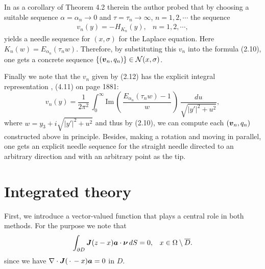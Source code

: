  In \cite{IProbeCarleman} as a corollary
 of Theorem 4.2 therein
 the author probed that
 by choosing a suitable sequence $\alpha=\alpha_n\rightarrow 0$ and $\tau=\tau_n\rightarrow\infty$, $n=1,2,\cdots$
 the sequence
 $$\begin{array}{ll}
 \displaystyle
 v_n(y)=-H_{K_n}(y), & 
 \displaystyle
 n=1,2,\cdots,
 \end{array}
 \tag {2.12}
 $$
 yields a needle sequence for $(x,\sigma)$ for the Laplace equation.  Here $K_n(w)=E_{\alpha_n}(\tau_nw)$.
 Therefore, by substituting this $v_n$ into the formula (2.10), one gets a concrete sequence 
 $\{(\mbox{\boldmath $v$}_n,q_n)\}\in{\cal N}(x,\sigma)$.
 
 
 
  
  
Finally we note that the $v_n$ given by (2.12) has the explicit integral representation \cite{IProbeCarleman}, (4.11) on page 1881:
$$\displaystyle
v_n(y)
=\frac{1}{2\pi^2}\,\int_0^{\infty}
\text{Im}\,\left(\,\frac{E_{\alpha_n}(\tau_n w)-1}{w}\,\right)\,\frac{du}{\sqrt{\vert y'\vert^2+u^2}},
$$
where $w=y_3+i\sqrt{\vert y'\vert^2+u^2}$ and thus by (2.10), we can compute 
each $(\mbox{\boldmath $v$}_n, q_n)$ constructed above  in principle.  
Besides, making a rotation and moving in parallel,
one gets an explicit needle sequence for the straight needle directed to an arbitrary direction and with
an arbitrary point as the tip.

 
  
  
  
  
  
  
  



\section{Integrated theory}





First, we introduce a vector-valued function that plays a central role in both methods.
For the purpose we note that 
 $$\begin{array}{ll}
 \displaystyle
 \int_{\partial D}\mbox{\boldmath $J$}(z-x)\mbox{\boldmath $a$}\cdot\mbox{\boldmath $\nu$}\,dS=0,
 & x\in\Omega\setminus\overline{D}.
 \end{array}
 $$
 since we have $\nabla\cdot \mbox{\boldmath $J$}(\,\cdot\,-x)\mbox{\boldmath $a$}=0$ in $D$.




$\quad$


